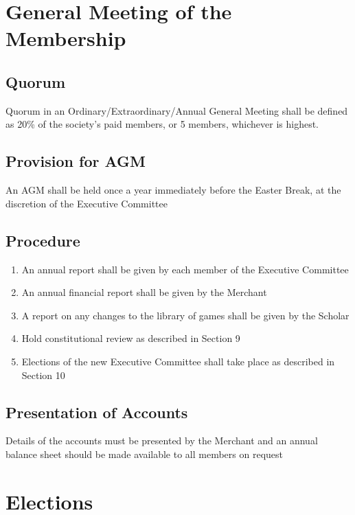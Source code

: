 \documentclass[hidelinks, 12pt, a4paper]{article}
\begin{document}
\section{General Meeting of the Membership}
\subsection{Quorum}
Quorum in an Ordinary/Extraordinary/Annual General Meeting shall be defined as 20\% of the society’s paid members, or 5 members, whichever is highest.

\subsection{Provision for AGM}
An AGM shall be held once a year immediately before the Easter Break, at the discretion of the Executive Committee

\subsection{Procedure}
\begin{enumerate}
	\item An annual report shall be given by each member of the Executive Committee
	\item An annual financial report shall be given by the Merchant
	\item A report on any changes to the library of games shall be given by the Scholar
	\item Hold constitutional review as described in Section 9
	\item Elections of the new Executive Committee shall take place as described in Section 10
\end{enumerate}

\subsection{Presentation of Accounts}
Details of the accounts must be presented by the Merchant and an annual balance sheet should be made available to all members on request

\section{Elections}
\end{document}
